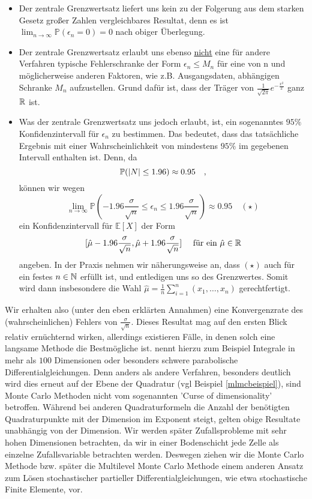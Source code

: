 	 \begin{itemize}
	 	\item Der zentrale Grenzwertsatz liefert uns kein zu der Folgerung aus dem starken Gesetz großer Zahlen vergleichbares Resultat, denn es ist  $ \lim_{n \to \infty} \mathbb{P}(\epsilon_n = 0) = 0 $ nach obiger Überlegung.
	 	\item Der zentrale Grenzwertsatz erlaubt uns ebenso \underline{nicht} eine für andere Verfahren typische Fehlerschranke der Form $ \epsilon_n \leq M_n $ für eine von n und möglicherweise anderen Faktoren, wie z.B. Ausgangsdaten, abhängigen Schranke $ M_n $ aufzustellen. Grund dafür ist, dass der Träger von $\frac{1}{\sqrt{2\pi}}e^{-\frac{x^2}{2}}$ ganz $ \mathbb{R} $ ist.
	 	\item Was der zentrale Grenzwertsatz uns jedoch erlaubt, ist, ein sogenanntes $ 95\% $ Konfidenzintervall für $ \epsilon_n $ zu bestimmen. Das bedeutet, dass das tatsächliche Ergebnis mit einer Wahrscheinlichkeit von mindestens $ 95 \% $ im gegebenen Intervall enthalten ist. Denn, da 
	 	\[
	 		\mathbb{P}(| N | \leq 1.96) \approx 0.95 \quad ,
	 	\]
	 	können wir wegen
	 	\[
	 		\lim\limits_{n\to\infty}\mathbb{P}(-1.96\frac{\sigma}{\sqrt{n}}\leq \epsilon_n \leq 1.96\frac{\sigma}{\sqrt{n}}) \approx 0.95 \quad (\star)
	 	\]
	 	ein Konfidenzintervall für $ \mathbb{E}[X] $ der Form
	 	\[
	 		[\hat{\mu}-1.96\frac{\sigma}{\sqrt{n}},\hat{\mu}+1.96\frac{\sigma}{\sqrt{n}}] \quad \text{ für ein } \hat{\mu} \in \mathbb{R}  
	 	\]
	 	angeben. In der Praxis nehmen wir näherungsweise an, dass $ (\star) $ auch für ein festes $ n \in \mathbb{N} $ erfüllt ist, und entledigen uns so des Grenzwertes. Somit wird dann insbesondere die Wahl $ \hat{\mu} = \frac{1}{n}\sum_{i=1}^{n}(x_1,\dots,x_n) $ gerechtfertigt.
	 \end{itemize}
 	Wir erhalten also (unter den eben erklärten Annahmen) eine Konvergenzrate des (wahrscheinlichen) Fehlers von $ \frac{\sigma}{\sqrt{n}} $. Dieses Resultat mag auf den ersten Blick relativ ernüchternd wirken, allerdings existieren Fälle, in denen solch eine langsame Methode die Bestmögliche ist. \cite{lapeyre2003introduction} nennt hierzu zum Beispiel Integrale in mehr als $ 100 $ Dimensionen oder besonders schwere parabolische Differentialgleichungen. Denn anders als andere Verfahren, besonders deutlich wird dies erneut auf der Ebene der Quadratur (vgl Beispiel \eqref{mlmcbeispiel}), sind Monte Carlo Methoden nicht vom sogenannten 'Curse of dimensionality' betroffen. Während bei anderen Quadraturformeln die Anzahl der benötigten Quadraturpunkte mit der Dimension im Exponent steigt, gelten obige Resultate unabhängig von der Dimension. Wir werden später Zufallsprobleme mit sehr hohen Dimensionen betrachten, da wir in einer Bodenschicht jede Zelle als einzelne Zufallsvariable betrachten werden. Deswegen ziehen wir die Monte Carlo Methode bzw. später die Multilevel Monte Carlo Methode einem anderen Ansatz zum Lösen stochastischer partieller Differentialgleichungen, wie etwa stochastische Finite Elemente, vor.
